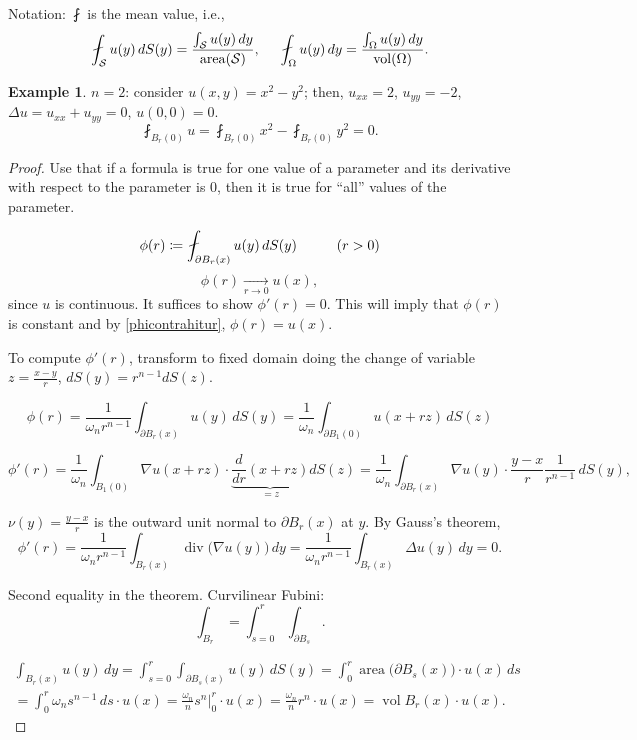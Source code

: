 \documentclass[12pt]{article}
\DeclareMathOperator{\diver}{div}
\DeclareMathOperator{\area}{area}
\DeclareMathOperator{\vol}{vol}
\theoremstyle{definition}
\newtheorem*{example*}{Example}
\begin{document}
Notation: $\fint$ is the mean value, i.e.,
\[\fint_\mathcal Su(y)\,dS(y)=\frac{\int_\mathcal Su(y)\,dy}{\area(\mathcal S)},\hspace{5mm}\fint_\Omega u(y)\,dy=\frac{\int_\Omega u(y)\,dy}{\vol(\Omega)}.\]

\begin{example*}
$n=2$: consider $u(x,y)=x^2-y^2$; then, $u_{xx}=2$, $u_{yy}=-2$, $\Delta u=u_{xx}+u_{yy}=0$, $u(0,0)=0$.
\[\fint_{B_r(0)}u=\fint_{B_r(0)}x^2-\fint_{B_r(0)}y^2=0.\]
\end{example*}

\begin{proof}
Use that if a formula is true for one value of a parameter and its derivative with respect to the parameter is $0$, then it is true for ``all'' values of the parameter.

\[\phi(r)\coloneqq\fint_{\partial B_r(x)}u(y)\,dS(y)\hspace{10mm}(r>0)\]
\begin{equation}\tag{$*$}\label{phicontrahitur}
\phi(r)\xrightarrow[r\to0]{}u(x),
\end{equation}
since $u$ is continuous. It suffices to show $\phi'(r)=0$. This will imply that $\phi(r)$ is constant and by \eqref{phicontrahitur}, $\phi(r)=u(x)$.

To compute $\phi'(r)$, transform to fixed domain doing the change of variable $z=\frac{x-y}r$, $dS(y)=r^{n-1}dS(z)$.

\[\phi(r)=\frac1{\omega_nr^{n-1}}\int_{\partial B_r(x)}u(y)\,dS(y)=\frac1{\omega_n}\int_{\partial B_1(0)}u(x+rz)\,dS(z)\]

\[\phi'(r)=\frac1{\omega_n}\int_{B_1(0)}\nabla u(x+rz)\cdot\underbrace{\frac d{dr}(x+rz)}_{=z}dS(z)=\frac1{\omega_n}\int_{\partial B_r(x)}\nabla u(y)\cdot\frac{y-x}r\frac1{r^{n-1}}\,dS(y),\]

$\nu(y)=\frac{y-x}r$ is the outward unit normal to $\partial B_r(x)$ at $y$. By Gauss's theorem,
\[\phi'(r)=\frac1{\omega_nr^{n-1}}\int_{B_r(x)}\diver\big(\nabla u(y)\big)\,dy=\frac1{\omega_nr^{n-1}}\int_{B_r(x)}\Delta u(y)\,dy=0.\]

Second equality in the theorem. Curvilinear Fubini:
\[\int_{B_r}=\int_{s=0}^r\int_{\partial B_s}.\]

\begin{multline*}
\int_{B_r(x)}u(y)\,dy=\int_{s=0}^r\int_{\partial B_s(x)}u(y)\,dS(y)=\int_0^r\area\big(\partial B_s(x)\big)\cdot u(x)\,ds\\
=\int_0^r\omega_ns^{n-1}\,ds\cdot u(x)=\frac{\omega_n}ns^n\Big|_0^r\cdot u(x)=\frac{\omega_n}nr^n\cdot u(x)=\vol B_r(x)\cdot u(x).
\end{multline*}
\end{proof}
\end{document}
